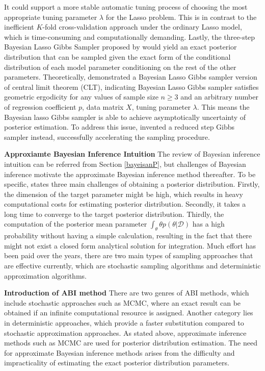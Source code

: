 It could support a more stable automatic tuning process of choosing the most appropriate tuning parameter $\lambda$ for the Lasso problem. This is in contrast to the inefficient $K$-fold cross-validation approach under the ordinary Lasso model, which is time-consuming and computationally demanding. Lastly, the three-step Bayesian Lasso Gibbs Sampler proposed by \cite{park_casella_2008} would yield an exact posterior distribution that can be sampled given the exact form of the conditional distribution of each model parameter conditioning on the rest of the other parameters. Theoretically, \cite{khare_hobert_2013} demonstrated a Bayesian Lasso Gibbs sampler version of central limit theorem (CLT), indicating Bayesian Lasso Gibbs sampler satisfies geometric ergodicity for any values of sample size $n \geq 3$ and an arbitrary number of regression coefficient $p$, data matrix $X$, tuning parameter $\lambda$. This means the Bayesian lasso Gibbs sampler is able to achieve asymptotically uncertainty of posterior estimation. To address this issue, \cite{FastBL} invented a reduced step Gibbs sampler instead, successfully accelerating the sampling procedure. 

\textbf{Approxiamte Bayesian Inference Intuition}
The review of Bayesian inference intuition can be referred from Section \ref{bayeisanP}, but challenges of Bayesian inference motivate the approximate Bayesian inference method thereafter. To be specific, \cite{bishop_2006} states three main challenges of obtaining a posterior distribution. Firstly, the dimension of the target parameter might be high, which results in heavy computational costs for estimating posterior distribution. Secondly, it takes a long time to converge to the target posterior distribution. Thirdly, the computation of the posterior mean parameter $\int_{\theta} \theta p(\theta|\mathcal{D})$ has a high probability without having a simple calculation, resulting in the fact that there might not exist a closed form analytical solution for integration. Much effort has been paid over the years, there are two main types of sampling approaches that are effective currently, which are stochastic sampling algorithms and deterministic approximation algorithms. 

\textbf{Introduction of ABI method}
There are two genres of ABI methods, which include stochastic approaches such as MCMC, where an exact result can be obtained if an infinite computational resource is assigned. Another category lies in deterministic approaches, which provide a faster substitution compared to stochastic approximation approaches.
As stated above, approximate inference methods such as MCMC are used for posterior distribution estimation. The need for approximate Bayesian inference methods arises from the difficulty and impracticality of estimating the exact posterior distribution parameters.

